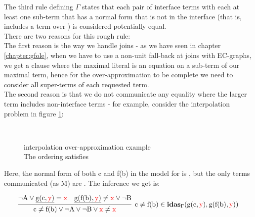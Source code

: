 \noindent
The third rule defining $\Gamma$ states that each pair of interface terms with each at least one sub-term that has a normal form that is not in the interface (that is, includes a term over \langbp) is considered potentially equal.\\
There are two reasons for this rough rule:\\
The first reason is the way we handle joins - as we have seen in chapter \ref{chapter:gfole}, 
when we have to use a non-unit fall-back at joins with EC-graphs, we get a clause where the maximal literal is an equation on a sub-term of our maximal term, hence for the over-approximation to be complete we need to consider all super-terms of each requested term.\\
The second reason is that we do not communicate any equality where the larger term includes non-interface terms - for example, consider the interpolation problem in figure \ref{example.4.1.3.2.1}:
\begin{figure}[H]
\\
\caption{interpolation over-approximation example\\
The ordering satisfies 
}
\label{example.4.1.3.2.1}
\end{figure}

Here, the normal form of both c and f(b) in the model for  is , but the only terms communicated (as M) are .
The inference we get is:

\bigskip

\noindent
\[
\begin{array}{llll}
	\vcenter{
		\infer[
			\inidasg{c\neq f(b)}{g(c,\textcolor{red}{y})}{g(f(b),\textcolor{red}{y})}
		]
		{\m{ c \neq f(b) \lor \lnot A \lor \lnot B \lor \textcolor{red}{x} \neq \textcolor{red}{x}}}
		{
			\m{\lnot A \lor \underline{g(c,\textcolor{red}{y})} = \textcolor{red}{x}} &
			\m{ \underline{g(f(b),\textcolor{red}{y})}\neq \textcolor{red}{x} \lor \lnot B}
		}
	} 
\\	
\end{array}
\]

